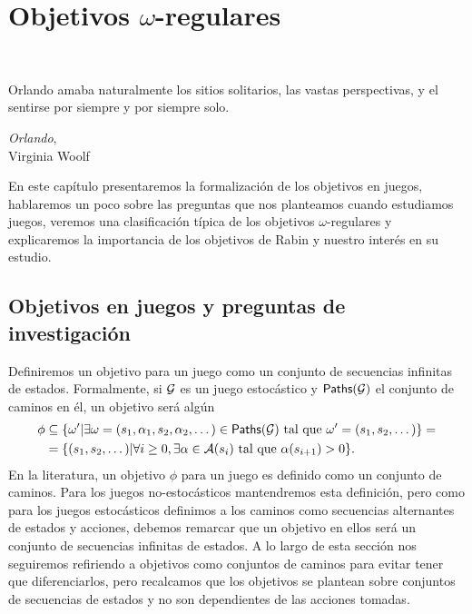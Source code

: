 \chapter{Objetivos $\omega$-regulares}
~\label{cap:objetivos}
\vspace{-1cm}
\epigraph{Orlando amaba naturalmente los sitios solitarios, las vastas perspectivas, y el sentirse por siempre y por siempre solo.}{\textit{Orlando}, \\ Virginia Woolf}


En este capítulo presentaremos la formalización de los objetivos en juegos,
hablaremos un poco sobre las preguntas que nos planteamos cuando estudiamos
juegos, veremos una clasificación típica de los objetivos $\omega$-regulares y
explicaremos la importancia de los objetivos de Rabin y nuestro interés en su
estudio.

\section{Objetivos en juegos y preguntas de investigación}

Definiremos un objetivo para un juego como un conjunto de secuencias infinitas
de estados. Formalmente, si $\mathcal{G}$ es un juego estocástico y $\textsf{Paths}(\mathcal{G})$ el
conjunto de caminos en él, un objetivo será algún
\begin{align*}
	\phi &\subseteq \{\omega' |
	\exists \omega = (s_1, \alpha_1, s_2, \alpha_2, \dots) \in \textsf{Paths}(\mathcal{G}) \text{
		tal que } \omega' = (s_1, s_2, \dots)\} =\\
	&= \{(s_1, s_2, \dots) | \forall i \geq
	0, \exists \alpha \in \mathcal{A}(s_i) \text{ tal que } \alpha(s_{i+1}) > 0\}.
\end{align*}
En la
literatura, un objetivo $\phi$ para un juego es definido como un conjunto de
caminos. Para los juegos no-estocásticos mantendremos esta definición, pero
como para los juegos estocásticos definimos a los caminos como secuencias
alternantes de estados y acciones, debemos remarcar que un objetivo en ellos
será un conjunto de secuencias infinitas de estados. A lo largo de esta sección
nos seguiremos refiriendo a objetivos como conjuntos de caminos para evitar
tener que diferenciarlos, pero recalcamos que los objetivos se plantean sobre
conjuntos de secuencias de estados y no son dependientes de las acciones
tomadas.

